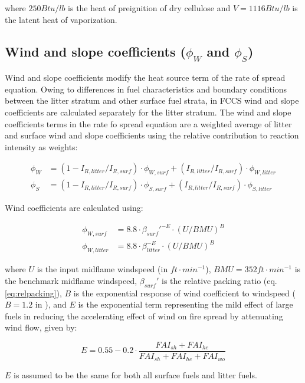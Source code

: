 \documentclass[]{book}
\begin{document}
where \(250 Btu/lb\) is the heat of preignition of dry cellulose and
\(V = 1116 Btu/lb\) is the latent heat of vaporization.
\subsection{Wind and slope coefficients ($\phi_W$ and $\phi_S$)} Wind
and slope coefficients modify the heat source term of the rate of spread
equation. Owing to differences in fuel characteristics and boundary
conditions between the litter stratum and other surface fuel strata, in
FCCS wind and slope coefficients are calculated separately for the
litter stratum. The wind and slope coefficients terms in the rate fo
spread equation are a weighted average of litter and surface wind and
slope coefficients using the relative contribution to reaction intensity
as weights:

\begin{eqnarray}
\phi_W &= (1 - I_{R, litter}/I_{R, surf})\cdot \phi_{W, surf} + (I_{R, litter}/I_{R, surf})\cdot \phi_{W, litter}\\
\phi_S &= (1 - I_{R, litter}/I_{R, surf})\cdot \phi_{S, surf} + (I_{R, litter}/I_{R, surf})\cdot \phi_{S, litter}
\end{eqnarray}

Wind coefficients are calculated using:

\begin{eqnarray}
\phi_{W, surf} &= 8.8 \cdot \beta_{surf}'^{-E}\cdot (U/BMU)^B\\
\phi_{W, litter} &= 8.8 \cdot \beta_{litter}^{-E}\cdot (U/BMU)^B
\end{eqnarray}

where \(U\) is the input midflame windspeed (in \(ft\cdot min^{-1}\)),
\(BMU=352 ft\cdot min^{-1}\) is the benchmark midflame windspeed,
\(\beta_{surf}'\) is the relative packing ratio (eq.
\ref{eq:relpacking}), \(B\) is the exponential response of wind
coefficient to windspeed (\(B=1.2\) in \citet{Sandberg2007}), and \(E\)
is the exponential term representing the mild effect of large fuels in
reducing the accelerating effect of wind on fire spread by attenuating
wind flow, given by:

\begin{equation}
E = 0.55 - 0.2 \cdot \frac{FAI_{sh}+FAI_{he}}{FAI_{sh}+FAI_{he}+FAI_{wo}}
\end{equation}

\(E\) is assumed to be the same for both all surface fuels and litter
fuels.
\end{document}
